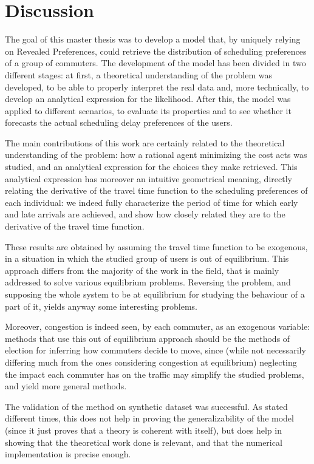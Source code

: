 \chapter{Discussion}
\label{chap:discussion}

The goal of this master thesis was to develop a model that,
by uniquely relying on Revealed Preferences,
could retrieve the distribution of scheduling preferences of a group of commuters.
The development of the model has been divided in two different stages:
at first, a theoretical understanding of the problem was developed,
to be able to properly interpret the real data and,
more technically, to develop an analytical expression for the likelihood.
After this, the model was applied to different scenarios,
to evaluate its properties and to see whether it forecasts the actual scheduling delay preferences of the users.

The main contributions of this work are certainly related to the theoretical understanding of the problem:
how a rational agent minimizing the cost acts was studied,
and an analytical expression for the choices they make retrieved.
This analytical expression has moreover an intuitive geometrical meaning,
directly relating the derivative of the travel time function to the scheduling preferences of each individual:
we indeed fully characterize the period of time for which early and late arrivals are achieved,
and show how closely related they are to the derivative of the travel time function.

These results are obtained by assuming the travel time function to be exogenous,
in a situation in which the studied group of users is out of equilibrium.
This approach differs from the majority of the work in the field,
that is mainly addressed to solve various equilibrium problems.
Reversing the problem, and supposing the whole system to be at equilibrium for studying the behaviour of a part of it,
yields anyway some interesting problems.

Moreover, congestion is indeed seen, by each commuter,
as an exogenous variable:
methods that use this out of equilibrium approach should be the methods of election for inferring how commuters decide to move,
since
(while not necessarily differing much from the ones considering congestion at equilibrium)
neglecting the impact each commuter has on the traffic may simplify the studied problems,
and yield more general methods.

The validation of the method on synthetic dataset was successful.
As stated different times,
this does not help in proving the generalizability of the model (since it just proves that a theory is coherent with itself),
but does help in showing that the theoretical work done is relevant,
and that the numerical implementation is precise enough.

